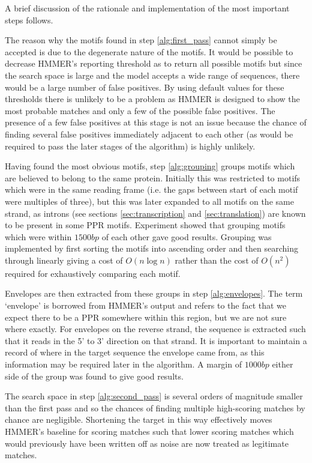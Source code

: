 A brief discussion of the rationale and implementation of the most important 
steps follows.

The reason why the motifs found in step \ref{alg:first_pass} cannot simply be
accepted is due to the degenerate nature of the motifs.
It would be possible to decrease HMMER's reporting threshold as to return all
possible motifs but since the search space is large and the model accepts a
wide range of sequences, there would be a large number of false positives.
By using default values for these thresholds there is unlikely to be a problem 
as HMMER is designed to show the most probable matches and only a few of
the possible false positives.
The presence of a few false positives at this stage is not an issue because the
chance of finding several false positives immediately adjacent to each other 
(as would be required to pass the later stages of the algorithm) is highly 
unlikely.

Having found the most obvious motifs, step \ref{alg:grouping} groups motifs
which are believed to belong to the same protein.
Initially this was restricted to motifs which were in the same reading frame
(i.e. the gaps between start of each motif were multiples of three), 
but this was later expanded to all motifs on the same strand, as introns 
(see sections \ref{sec:transcription} and \ref{sec:translation}) 
are known to be present in some PPR motifs.
Experiment showed that grouping motifs which were within $1500bp$ of each other
gave good results.
Grouping was implemented by first sorting the motifs into ascending order and 
then searching through linearly giving a cost of $O(n \log n)$ rather than the 
cost of $O(n^2)$ required for exhaustively comparing each motif.

Envelopes are then extracted from these groups in step \ref{alg:envelopes}.
The term `envelope' is borrowed from HMMER's output and refers to the fact that
we expect there to be a PPR somewhere within this region, but we are not sure
where exactly.
For envelopes on the reverse strand, the sequence is extracted such that it
reads in the 5' to 3' direction on that strand.
It is important to maintain a record of where in the target sequence the
envelope came from, as this information may be required later in the algorithm.
A margin of $1000bp$ either side of the group was found to give good results.

The search space in step \ref{alg:second_pass} is several orders of magnitude 
smaller than the first pass and so the chances of finding multiple high-scoring 
matches by chance are negligible.
Shortening the target in this way effectively moves HMMER's baseline for
scoring matches such that lower scoring matches which would previously have 
been written off as noise are now treated as legitimate matches.

